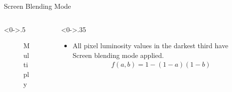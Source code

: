 \documentclass{beamer}
\begin{document}
	\begin{frame}{Screen Blending Mode}
 
		\begin{columns}[T]
			\begin{column}<0->{.5\textwidth}
				\begin{figure}[thpb]
					\centering
					\caption{Multiply}
					\label{fig:1}
				\end{figure}
			\end{column}%
			\hfill%
			\begin{column}<0->{.35\textwidth}
				


			    \begin{itemize} 
			    \item All pixel luminosity values in the darkest third have Screen blending mode applied. 
			    \begin{align*} f(a,b) = 1-(1-a)(1-b) \end{align*}
			    
			    \end{itemize}
		        
			\end{column}
		\end{columns}
	\end{frame}
	
\end{document}
